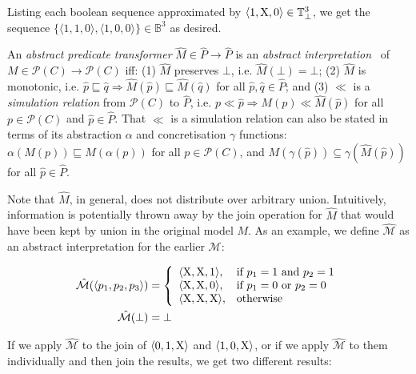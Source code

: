 \noindent Listing each boolean sequence approximated by $\langle 1, \mathrm{X}, 0 \rangle \in \mathbb{T}_{\bot}^{3}$, we get the sequence $\{ \langle 1, 1, 0 \rangle, \langle 1, 0, 0 \rangle \} \in \mathbb{B}^{3}$ as desired.


An \textit{abstract predicate transformer} $\hat M \in \hat P \rightarrow \hat P$ is an \textit{abstract interpretation}~\cite{cousot1996} of $M \in \mathcal{P}(C) \rightarrow \mathcal{P}(C)$ iff: (1) $\hat M$ preserves $\bot$, i.e. $\hat M(\bot) = \bot$; (2) $\hat M$ is monotonic, i.e. $\hat p \sqsubseteq \hat q \Rightarrow \hat M (\hat p) \sqsubseteq \hat M (\hat q)$ for all $\hat p, \hat q \in \hat P$; and (3) $\ll$ is a \textit{simulation relation} from $\mathcal{P}(C)$ to $\hat P$, i.e. $p \ll \hat p \Rightarrow M (p) \ll \hat M (\hat p)$ for all $p \in \mathcal{P}(C)$ and $\hat p \in \hat P$. That $\ll$ is a simulation relation can also be stated in terms of its abstraction $\alpha$ and concretisation $\gamma$ functions: $\alpha(M(p)) \sqsubseteq \hat M(\alpha(p))$ for all $p \in \mathcal{P}(C)$, and $M(\gamma(\hat p)) \subseteq \gamma(\hat M(\hat p))$ for all $\hat p \in \hat P$.

Note that $\hat M$, in general, does not distribute over arbitrary union. Intuitively, information is potentially thrown away by the join operation for $\hat M$ that would have been kept by union in the original model $M$. As an example, we define $\hat{\mathcal{M}}$ as an abstract interpretation for the earlier $\mathcal{M}$:

\begin{align*}
\hat{\mathcal{M}}(\langle p_{1}, p_{2}, p_{3} \rangle) &=
\left\{
  \begin{array}{ll}
    \langle \mathrm{X}, \mathrm{X}, 1 \rangle, & \textrm{if } p_{1} = 1 \textrm{ and } p_{2} = 1 \\
    \langle \mathrm{X}, \mathrm{X}, 0 \rangle, & \textrm{if } p_{1} = 0 \textrm{ or } p_{2} = 0 \\
    \langle \mathrm{X}, \mathrm{X}, \mathrm{X} \rangle, & \textrm{otherwise}
  \end{array}
\right. \\
\hat{\mathcal{M}}(\bot) &= \bot
\end{align*}

\noindent If we apply $\hat{\mathcal{M}}$ to the join of $\langle 0, 1, \mathrm{X} \rangle$ and $\langle 1, 0, \mathrm{X} \rangle$, or if we apply $\hat{\mathcal{M}}$ to them individually and then join the results, we get two different results:

